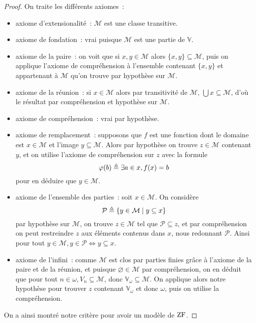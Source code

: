 \begin{proof}
  On traite les différents axiomes~:
  \begin{itemize}
  \item axiome d'extensionalité~: $\mathcal M$ est une classe transitive.
  \item axiome de fondation~: vrai puisque $\mathcal M$ est une partie de
    $\mathbb V$.
  \item axiome de la paire~: on voit que si $x, y \in \mathcal M$ alors
    $\{x,y\} \subseteq \mathcal M$, puis on applique l'axiome de compréhension
    à l'ensemble contenant $\{x,y\}$ et appartenant à $\mathcal M$ qu'on trouve
    par hypothèse sur $\mathcal M$.
  \item axiome de la réunion~: si $x \in \mathcal M$ alors par transitivité de
    $\mathcal M$, $\bigcup x \subseteq \mathcal M$, d'où le résultat par
    compréhension et hypothèse sur $\mathcal M$.
  \item axiome de compréhension~: vrai par hypothèse.
  \item axiome de remplacement~: supposons que $f$ est une fonction dont le
    domaine est $x \in \mathcal M$ et l'image $y \subseteq \mathcal M$. Alors
    par hypothèse on trouve $z \in \mathcal M$ contenant $y$, et on utilise
    l'axiome de compréhension sur $z$ avec la formule
    \[\varphi(b) \triangleq \exists a \in x, f(x) = b\]
    pour en déduire que $y \in \mathcal M$.
  \item axiome de l'ensemble des parties~: soit $x \in \mathcal M$. On
    considère
    \[\mathcal P \triangleq \{ y \in \mathcal M \mid y \subseteq x\}\]
    par hypothèse sur $\mathcal M$, on trouve $z \in \mathcal M$ tel que
    $\mathcal P \subseteq z$, et par compréhension on peut restreindre $z$
    aux éléments contenus dans $x$, nous redonnant $\mathcal P$. Ainsi pour
    tout $y \in \mathcal M, y \in \mathcal P \iff y \subseteq x$.
  \item axiome de l'infini~: comme $\mathcal M$ est clos par parties finies
    grâce à l'axiome de la paire et de la réunion, et puisque
    $\varnothing \in \mathcal M$ par compréhension, on en déduit que pour tout
    $n \in \omega, V_n \subseteq \mathcal M$, donc
    $\mathbb V_\omega \subseteq \mathcal M$. On applique alors notre hypothèse
    pour trouver $z$ contenant $\mathbb V_\omega$ et donc $\omega$, puis on
    utilise la compréhension.
  \end{itemize}
  On a ainsi montré notre critère pour avoir un modèle de $\operatorname{ZF}$.
\end{proof}

